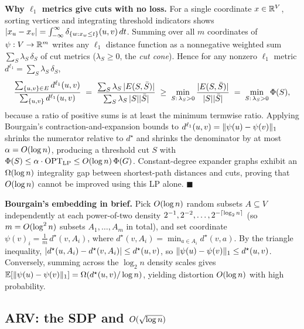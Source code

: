 \begin{whybox}
\textbf{Why $\ell_1$ metrics give cuts with no loss.} For a single coordinate $x\in\mathbb{R}^V$, sorting vertices and
integrating threshold indicators shows $\lvert x_u - x_v\rvert = \int_{-\infty}^{\infty} \delta_{\{w : x_w \le t\}}(u,v)\,dt$.
Summing over all $m$ coordinates of $\psi:V\to\mathbb{R}^m$ writes any $\ell_1$ distance function as a nonnegative
weighted sum $\sum_S \lambda_S\,\delta_S$ of cut metrics ($\lambda_S\ge 0$, the \emph{cut cone}). Hence for
any nonzero $\ell_1$ metric $d^{\ell_1} = \sum_S \lambda_S\,\delta_S$,
\[
  \frac{\sum_{\{u,v\}\in E} d^{\ell_1}(u,v)}{\sum_{\{u,v\}} d^{\ell_1}(u,v)}
  \;=\; \frac{\sum_S \lambda_S\,\lvert E(S,\bar S)\rvert}{\sum_S \lambda_S\,\lvert S\rvert\lvert\bar S\rvert}
  \;\ge\; \min_{S:\,\lambda_S>0} \frac{\lvert E(S,\bar S)\rvert}{\lvert S\rvert\lvert\bar S\rvert}
  \;=\; \min_{S:\,\lambda_S>0} \Phi(S),
\]
because a ratio of positive sums is at least the minimum termwise ratio. Applying Bourgain's contraction-and-expansion
bounds to $d^{\ell_1}(u,v)=\lVert\psi(u)-\psi(v)\rVert_1$ shrinks the numerator relative to $d^\star$ and shrinks the
denominator by at most $\alpha = O(\log n)$, producing a threshold cut $S$ with
$\Phi(S) \le \alpha\cdot\mathrm{OPT}_{\mathrm{LP}} \le O(\log n)\,\Phi(G)$. Constant-degree expander
graphs exhibit an $\Omega(\log n)$ integrality gap between shortest-path distances and cuts, proving that
$O(\log n)$ cannot be improved using this LP alone. $\blacksquare$
\end{whybox}

\begin{focusbox}
\textbf{Bourgain's embedding in brief.} Pick $O(\log n)$ random subsets $A\subseteq V$ independently at each
power-of-two density $2^{-1}, 2^{-2}, \dots, 2^{-\lceil\log_2 n\rceil}$ (so $m = O(\log^2 n)$ subsets $A_1,\dots,A_m$
in total), and set coordinate $\psi(v)_i = \tfrac{1}{m}\,d^\star(v,A_i)$, where $d^\star(v,A_i)=\min_{a\in A_i} d^\star(v,a)$.
By the triangle inequality, $\lvert d^\star(u,A_i)-d^\star(v,A_i)\rvert \le d^\star(u,v)$, so $\lVert\psi(u)-\psi(v)\rVert_1 \le d^\star(u,v)$.
Conversely, summing across the $\log_2 n$ density scales gives $\mathbb{E}[\lVert\psi(u)-\psi(v)\rVert_1] = \Omega(d^\star(u,v)/\log n)$,
yielding distortion $O(\log n)$ with high probability.
\end{focusbox}

\subsection{ARV: the SDP and $O(\sqrt{\log n})$}

